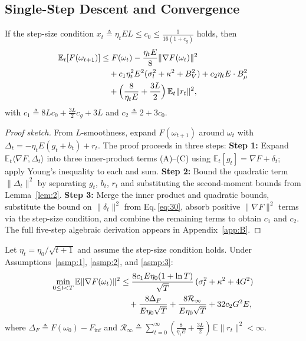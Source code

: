 \subsection{Single-Step Descent and Convergence}

\begin{lemma}\label{lem:3}
  If the step-size condition \(x_t \triangleq \eta_t E L \le c_0 \le \frac{1}{16(1+c_g)}\) holds, then
  \begin{align}
    \mathbb E_t[F(\omega_{t+1})]
    &\le F(\omega_t) - \frac{\eta_t E}{8}\|\nabla F(\omega_t)\|^2 \notag\\
    &\quad + c_1\eta_t^2 E^2(\sigma_l^2 + \kappa^2 + B_V^2)
       + c_2\eta_t E \cdot B_\mu^2 \notag\\
    &\quad + \Bigl(\frac{8}{\eta_t E} + \frac{3L}{2}\Bigr)\,\mathbb E_t\|r_t\|^2,
    \label{eq:33}
  \end{align}
  with \(c_1 \triangleq 8L c_0 + \frac{3L}{2}c_g + 3L\) and \(c_2 \triangleq 2 + 3c_0\).
\end{lemma}

\begin{proof}[Proof sketch]
  From \(L\)-smoothness, expand \(F(\omega_{t+1})\) around \(\omega_t\) with \(\Delta_t = -\eta_t E(g_t + b_t) + r_t\).
  The proof proceeds in three steps:
  \textbf{Step 1:} Expand \(\mathbb E_t\langle\nabla F, \Delta_t\rangle\) into three inner-product terms (A)--(C) using \(\mathbb E_t[g_t] = \nabla F + \delta_t\); apply Young's inequality to each and sum.
  \textbf{Step 2:} Bound the quadratic term \(\|\Delta_t\|^2\) by separating \(g_t\), \(b_t\), \(r_t\) and substituting the second-moment bounds from Lemma~\ref{lem:2}.
  \textbf{Step 3:} Merge the inner product and quadratic bounds, substitute the bound on \(\|\delta_t\|^2\) from Eq.\,\eqref{eq:30}, absorb positive \(\|\nabla F\|^2\) terms via the step-size condition, and combine the remaining terms to obtain \(c_1\) and \(c_2\).
  The full five-step algebraic derivation appears in Appendix~\ref{app:B}.
\end{proof}

\begin{theorem}\label{thm:1}
  Let \(\eta_t = \eta_0 / \sqrt{t+1}\) and assume the step-size condition holds.
  Under Assumptions~\ref{asmp:1}, \ref{asmp:2}, and \ref{asmp:3}:
  \begin{align}
    \min_{0 \le t < T} \mathbb E\|\nabla F(\omega_t)\|^2
    &\le \frac{8c_1 E\eta_0(1 + \ln T)}{\sqrt{T}}\,
          (\sigma_l^2 + \kappa^2 + 4G^2) \notag\\
    &\quad + \frac{8\Delta_F}{E\eta_0\sqrt{T}}
       + \frac{8\mathcal R_\infty}{E\eta_0\sqrt{T}}
       + 32 c_2 G^2 E, 
    \label{eq:36}
  \end{align}
  where \(\Delta_F \triangleq F(\omega_0) - F_{\inf}\) and
  \(\mathcal R_\infty \triangleq \sum_{t=0}^{\infty}(\frac{8}{\eta_t E} + \frac{3L}{2})\,\mathbb E\|r_t\|^2 < \infty\).
\end{theorem}


